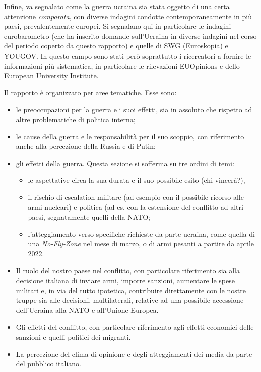 \documentclass[
]{book}
\providecommand{\tightlist}{%
  \setlength{\itemsep}{0pt}\setlength{\parskip}{0pt}}
\begin{document}
Infine, va segnalato come la guerra ucraina sia stata oggetto di una certa attenzione \emph{comparata}, con diverse indagini condotte contemporaneamente in più paesi, prevalentemente europei. Si segnalano qui in particolare le indagini eurobarometro (che ha inserito domande sull'Ucraina in diverse indagini nel corso del periodo coperto da questo rapporto) e quelle di SWG (Euroskopia) e YOUGOV. In questo campo sono stati però soprattutto i ricercatori a fornire le informazioni più sistematica, in particolare le rilevazioni EUOpinions e dello European University Institute.

Il rapporto è organizzato per aree tematiche. Esse sono:

\begin{itemize}
\item
  le preoccupazioni per la guerra e i suoi effetti, sia in assoluto che rispetto ad altre problematiche di politica interna;
\item
  le cause della guerra e le responsabilità per il suo scoppio, con riferimento anche alla percezione della Russia e di Putin;
\item
  gli effetti della guerra. Questa sezione si sofferma su tre ordini di temi:

  \begin{itemize}
  \tightlist
  \item
    le aspettative circa la sua durata e il suo possibile esito (chi vincerà?),
  \item
    il rischio di escalation militare (ad esempio con il possibile ricorso alle armi nucleari) e politica (ad es. con la estensione del conflitto ad altri paesi, segnatamente quelli della NATO;
  \item
    l'atteggiamento verso specifiche richieste da parte ucraina, come quella di una \emph{No-Fly-Zone} nel mese di marzo, o di armi pesanti a partire da aprile 2022.
  \end{itemize}
\item
  Il ruolo del nostro paese nel conflitto, con particolare riferimento sia alla decisione italiana di inviare armi, imporre sanzioni, aumentare le spese militari e, in via del tutto ipotetica, contribuire direttamente con le nostre truppe sia alle decisioni, multilaterali, relative ad una possibile accessione dell'Ucraina alla NATO e all'Unione Europea.
\item
  Gli effetti del conflitto, con particolare riferimento agli effetti economici delle sanzioni e quelli politici dei migranti.
\item
  La percezione del clima di opinione e degli atteggiamenti dei media da parte del pubblico italiano.
\end{itemize}
\end{document}
